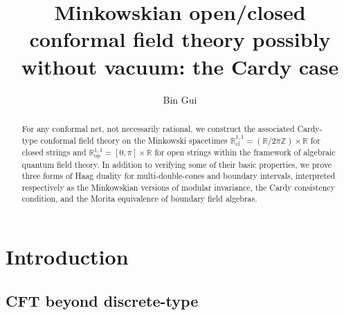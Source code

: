 \documentclass[11pt,b5paper,notitlepage]{article}
\title{Minkowskian open/closed conformal field theory possibly without vacuum: the Cardy case}
\author{{\sc Bin Gui}
}
\date{}
\theoremstyle{definition}
\theoremstyle{plain}
\newcommand{\Zbb}{\mathbb Z}
\newcommand{\Rbb}{\mathbb R}
\newcommand{\Rcl}{\mathbb R^{1,1}_{\mathrm{cl}}}
\newcommand{\Rop}{\mathbb R^{1,1}_{\mathrm{op}}}
\numberwithin{equation}{section}
\begin{document}
\sloppy %
	







	\maketitle

\begin{abstract}
For any conformal net, not necessarily rational, we construct the associated Cardy-type conformal field theory on the Minkowski spacetimes $\Rcl=(\Rbb/2\pi\Zbb)\times\Rbb$ for closed strings and $\Rop=[0,\pi]\times\Rbb$ for open strings within the framework of algebraic quantum field theory. In addition to verifying some of their basic properties, we prove three forms of Haag duality for multi-double-cones and boundary intervals, interpreted respectively as the Minkowskian versions of modular invariance, the Cardy consistency condition, and the Morita equivalence of boundary field algebras.
\end{abstract}




\tableofcontents


\section{Introduction}



\subsection{CFT beyond discrete-type}
\end{document}
